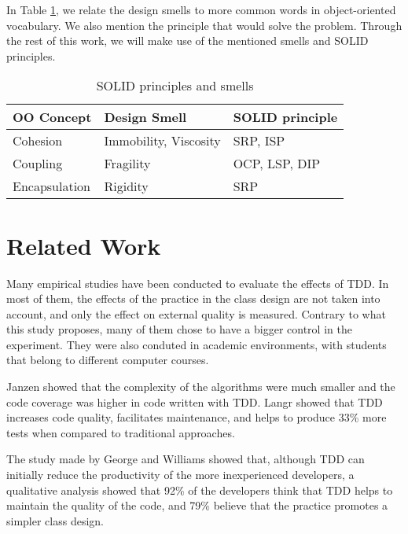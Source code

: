 \documentclass[times]{elsarticle}
\begin{document}
In Table \ref{tab:solid}, we relate the design smells to more common words
in object-oriented vocabulary. We also mention the principle that would solve
the problem. Through the rest of this work, we will make use of the mentioned
smells and SOLID principles. 

\begin{table}
	\centering
	\begin{tabular}{| p{3cm} | p{4cm} | p{3cm} | }
		\hline
		\textbf{OO Concept} & \textbf{Design Smell} & \textbf{SOLID principle}\\
		
		\hline
		
		Cohesion & Immobility, Viscosity & SRP, ISP \\ \hline
		
		Coupling & Fragility & OCP, LSP, DIP \\ \hline
		
		Encapsulation & Rigidity & SRP \\
		\hline
	\end{tabular}
	\caption{SOLID principles and smells}
	\label{tab:solid}
\end{table}


\section{Related Work}
\label{cap:trabalhos-relacionados}

Many empirical studies have been conducted to evaluate the effects of TDD.
In most of them, the effects of the practice in the class design are not taken
into account, and only the effect on external quality is measured.
Contrary to what this study proposes, many of them chose
to have a bigger control in the experiment. They were also conduted in academic
environments, with students that belong to different computer courses.

Janzen \cite{janzen-arch-improvement} showed that the complexity of the algorithms
were much smaller and the code coverage was higher in code written with TDD.
Langr \cite{langr} showed that TDD increases code quality, facilitates
maintenance, and helps to produce 33\% more tests when compared to traditional
approaches.

The study made by George and Williams \cite{george-e-williams} showed that,
although TDD can initially reduce the productivity of the more inexperienced
developers, a qualitative analysis showed that 92\% of the developers think
that TDD helps to maintain the quality of the code, and 79\% believe that
the practice promotes a simpler class design.
\end{document}
